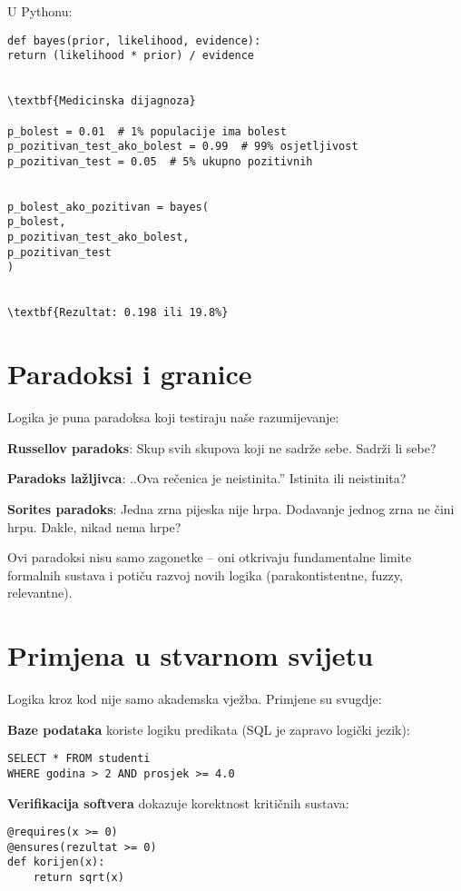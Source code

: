U Pythonu:
\begin{verbatim}
def bayes(prior, likelihood, evidence):
return (likelihood * prior) / evidence


\textbf{Medicinska dijagnoza}

p_bolest = 0.01  # 1% populacije ima bolest
p_pozitivan_test_ako_bolest = 0.99  # 99% osjetljivost
p_pozitivan_test = 0.05  # 5% ukupno pozitivnih


p_bolest_ako_pozitivan = bayes(
p_bolest,
p_pozitivan_test_ako_bolest,
p_pozitivan_test
)


\textbf{Rezultat: 0.198 ili 19.8%}

\end{verbatim}


\section{Paradoksi i granice}


Logika je puna paradoksa koji testiraju naše razumijevanje:


\textbf{Russellov paradoks}: Skup svih skupova koji ne sadrže sebe. Sadrži li sebe?


\textbf{Paradoks lažljivca}: ..Ova rečenica je neistinita.'' Istinita ili neistinita?


\textbf{Sorites paradoks}: Jedna zrna pijeska nije hrpa. Dodavanje jednog zrna ne čini hrpu. Dakle, nikad nema hrpe?


Ovi paradoksi nisu samo zagonetke -- oni otkrivaju fundamentalne limite formalnih sustava i potiču razvoj novih logika (parakontistentne, fuzzy, relevantne).


\section{Primjena u stvarnom svijetu}


Logika kroz kod nije samo akademska vježba. Primjene su svugdje:


\textbf{Baze podataka} koriste logiku predikata (SQL je zapravo logički jezik):
\begin{verbatim}
SELECT * FROM studenti
WHERE godina > 2 AND prosjek >= 4.0
\end{verbatim}


\textbf{Verifikacija softvera} dokazuje korektnost kritičnih sustava:
\begin{verbatim}
@requires(x >= 0)
@ensures(rezultat >= 0)
def korijen(x):
    return sqrt(x)
\end{verbatim}


